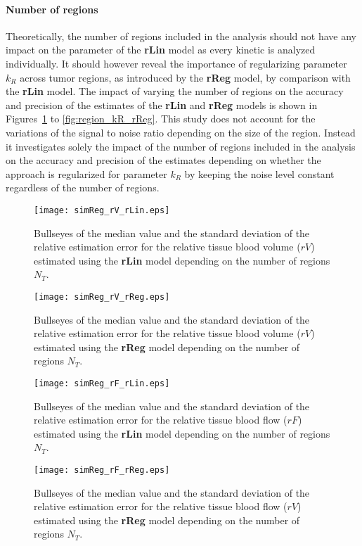 \paragraph{Number of regions}
Theoretically, the number of regions included in the analysis should not have any impact on the parameter of the \textbf{rLin} model as every kinetic is analyzed individually.
It should however reveal the importance of regularizing parameter $k_R$ across tumor regions, as introduced by the \textbf{rReg} model, by comparison with the \textbf{rLin} model.
The impact of varying the number of regions on the accuracy and precision of the estimates of the \textbf{rLin} and \textbf{rReg} models is shown in Figures~\ref{fig:region_rV_rLin} to \ref{fig:region_kR_rReg}.
This study does not account for the variations of the signal to noise ratio depending on the size of the region.
Instead it investigates solely the impact of the number of regions included in the analysis on the accuracy and precision of the estimates depending on whether the approach is regularized for parameter $k_R$ by keeping the noise level constant regardless of the number of regions.

\begin{figure}
\texttt{[image: simReg\_rV\_rLin.eps]}
\caption{Bullseyes of the median value and the standard deviation of the relative estimation error for the relative tissue blood volume ($rV$) estimated using the \textbf{rLin} model depending on the number of regions $N_T$.}
\label{fig:region_rV_rLin}
\end{figure}

\begin{figure}
\texttt{[image: simReg\_rV\_rReg.eps]}
\caption{Bullseyes of the median value and the standard deviation of the relative estimation error for the relative tissue blood volume ($rV$) estimated using the \textbf{rReg} model depending on the number of regions $N_T$.}
\label{fig:region_rV_rReg}
\end{figure}

\begin{figure}
\texttt{[image: simReg\_rF\_rLin.eps]}
\caption{Bullseyes of the median value and the standard deviation of the relative estimation error for the relative tissue blood flow ($rF$) estimated using the \textbf{rLin} model depending on the number of regions $N_T$.}
\label{fig:region_rF_rLin}
\end{figure}

\begin{figure}
\texttt{[image: simReg\_rF\_rReg.eps]}
\caption{Bullseyes of the median value and the standard deviation of the relative estimation error for the relative tissue blood flow ($rV$) estimated using the \textbf{rReg} model depending on the number of regions $N_T$.}
\label{fig:region_rF_rReg}
\end{figure}

